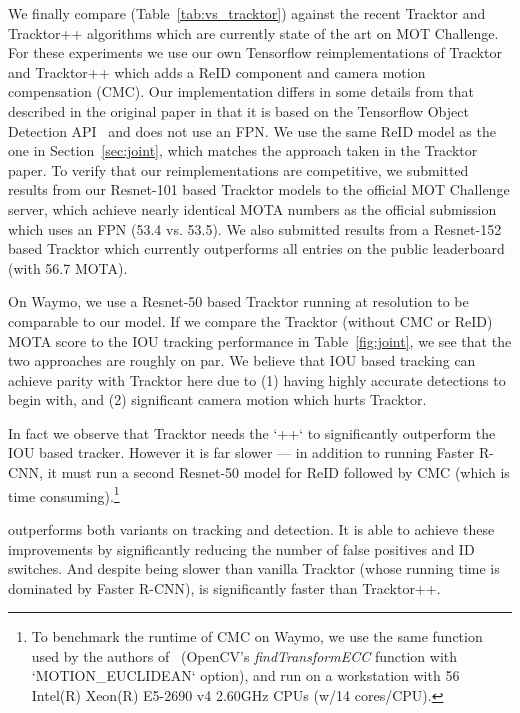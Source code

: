 We finally compare (Table~\ref{tab:vs_tracktor}) 
against the recent Tracktor and Tracktor++ algorithms
which are currently state of the art on MOT Challenge. 
For these experiments we use our own Tensorflow reimplementations
of Tracktor and Tracktor++ which adds a ReID component and 
camera motion compensation (CMC). 
Our implementation differs in some details
from that described in the original paper in that it is based on the
Tensorflow Object Detection API~\cite{huang2017speed}
and does not use an FPN.  
We use the same ReID model as the one in Section~\ref{sec:joint}, 
which matches the approach taken in the Tracktor paper.
To verify that our reimplementations are
competitive, we submitted results
from our Resnet-101
based Tracktor models to the official MOT Challenge server, which 
achieve nearly identical MOTA numbers as the official submission which 
uses an FPN (53.4 vs. 53.5).  We also submitted results from
a Resnet-152 based Tracktor which currently outperforms all 
entries on the public leaderboard (with 56.7 MOTA).  

On  Waymo, we use a  Resnet-50 based Tracktor  running at 
 resolution to be comparable to our model.
If we compare the  Tracktor (without
CMC or ReID) MOTA score to the IOU tracking performance in Table~\ref{fig:joint},
we see that the two approaches are roughly on par.  We believe that IOU based tracking can achieve parity with 
Tracktor here due to (1) having highly accurate detections to begin with,
and (2) significant camera motion which hurts  Tracktor.

In fact we observe that
Tracktor needs the `++` to significantly outperform the IOU based tracker.
However it is far slower --- in addition to running
Faster R-CNN, it must run a second Resnet-50 model for ReID
followed by CMC (which is time consuming).\footnote{
To benchmark the runtime of CMC on Waymo, we use the same function used
by the authors of~\cite{bergmann2019tracking} 
(OpenCV's \emph{findTransformECC} function with `MOTION\_EUCLIDEAN` option),
and run on a workstation with 56 Intel(R) Xeon(R)  E5-2690 v4 2.60GHz CPUs (w/14 cores/CPU).
}

\modelname outperforms both variants on tracking and detection. It 
is able to achieve these improvements by significantly reducing the number of
false positives and ID switches.  And despite being slower than  vanilla
Tracktor  (whose running time is dominated by Faster R-CNN), \modelname is 
significantly faster than Tracktor++.


